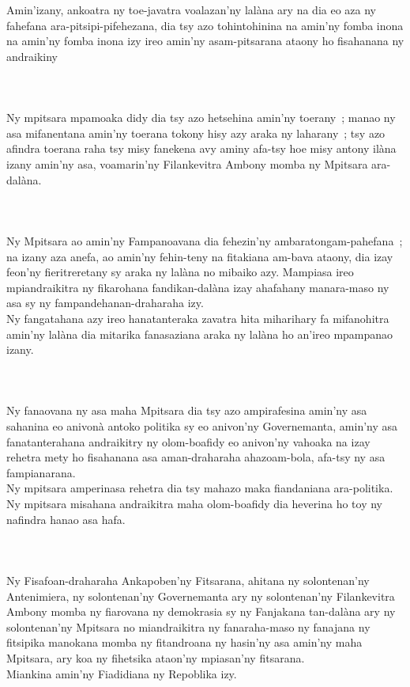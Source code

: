 \documentclass[12pt]{article}
\newcounter{laharana}
\newcommand{\andininy}[0]{
  \paragraph{%
    \NoCaseChange{%
      Andininy~\addtocounter{laharana}{1}\thelaharana.}\label{and:\thelaharana}~%
  }%
}
\begin{document}
\noindent
Amin'izany, ankoatra ny toe-javatra voalazan'ny lalàna ary na dia eo aza ny
fahefana ara-pitsipi-pifehezana, dia tsy azo tohintohinina na amin'ny fomba
inona na amin'ny fomba inona izy ireo amin'ny asam-pitsarana ataony ho
fisahanana ny andraikiny

\andininy{}Ny mpitsara mpamoaka didy dia tsy azo hetsehina amin'ny toerany~;
manao ny asa mifanentana amin'ny toerana tokony hisy azy araka ny laharany~; tsy
azo afindra toerana raha tsy misy fanekena avy aminy afa-tsy hoe misy antony
ilàna izany amin'ny asa, voamarin'ny Filankevitra Ambony momba ny Mpitsara
ara-dalàna.

\andininy{}Ny Mpitsara ao amin'ny Fampanoavana dia fehezin'ny
ambaratongam-pahefana~; na izany aza anefa, ao amin'ny fehin-teny na fitakiana
am-bava ataony, dia izay feon'ny fieritreretany sy araka ny lalàna no mibaiko
azy. Mampiasa ireo mpiandraikitra ny fikarohana fandikan-dalàna izay ahafahany
manara-maso ny asa sy ny fampandehanan-draharaha izy.\\

\noindent
Ny fangatahana azy ireo hanatanteraka zavatra hita miharihary fa mifanohitra
amin'ny lalàna dia mitarika fanasaziana araka ny lalàna ho an'ireo mpampanao
izany.

\andininy{}Ny fanaovana ny asa maha Mpitsara dia tsy azo ampirafesina amin'ny
asa sahanina eo anivonà antoko politika sy eo anivon'ny Governemanta, amin'ny
asa fanatanterahana andraikitry ny olom-boafidy eo anivon'ny vahoaka na izay
rehetra mety ho fisahanana asa aman-draharaha ahazoam-bola, afa-tsy ny asa
fampianarana.\\

\noindent
Ny mpitsara amperinasa rehetra dia tsy mahazo maka fiandaniana ara-politika.\\

\noindent
Ny mpitsara misahana andraikitra maha olom-boafidy dia heverina ho toy ny
nafindra hanao asa hafa.

\andininy{}Ny Fisafoan-draharaha Ankapoben'ny Fitsarana, ahitana ny
solontenan'ny Antenimiera, ny solontenan'ny Governemanta ary ny solontenan'ny
Filankevitra Ambony momba ny fiarovana ny demokrasia sy ny Fanjakana tan-dalàna
ary ny solontenan'ny Mpitsara no miandraikitra ny fanaraha-maso ny fanajana ny
fitsipika manokana momba ny fitandroana ny hasin'ny asa amin'ny maha Mpitsara,
ary koa ny fihetsika ataon'ny mpiasan'ny fitsarana.\\

\noindent
Miankina amin'ny Fiadidiana ny Repoblika izy.\\
\end{document}
